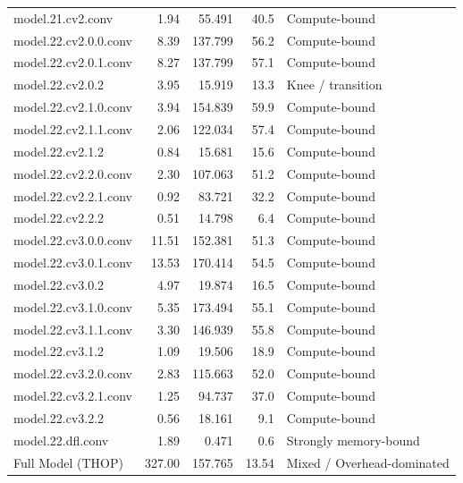 \documentclass[12pt,a4paper]{report}
\begin{document}
\begin{longtable}{p{} r r r p{}}
model.21.cv2.conv                    & 1.94  & 55.491  & 40.5 & Compute-bound \\
model.22.cv2.0.0.conv                & 8.39  & 137.799 & 56.2 & Compute-bound \\
model.22.cv2.0.1.conv                & 8.27  & 137.799 & 57.1 & Compute-bound \\
model.22.cv2.0.2                     & 3.95  & 15.919  & 13.3 & Knee / transition \\
model.22.cv2.1.0.conv                & 3.94  & 154.839 & 59.9 & Compute-bound \\
model.22.cv2.1.1.conv                & 2.06  & 122.034 & 57.4 & Compute-bound \\
model.22.cv2.1.2                     & 0.84  & 15.681  & 15.6 & Compute-bound \\
model.22.cv2.2.0.conv                & 2.30  & 107.063 & 51.2 & Compute-bound \\
model.22.cv2.2.1.conv                & 0.92  & 83.721  & 32.2 & Compute-bound \\
model.22.cv2.2.2                     & 0.51  & 14.798  & 6.4  & Compute-bound \\
model.22.cv3.0.0.conv                & 11.51 & 152.381 & 51.3 & Compute-bound \\
model.22.cv3.0.1.conv                & 13.53 & 170.414 & 54.5 & Compute-bound \\
model.22.cv3.0.2                     & 4.97  & 19.874  & 16.5 & Compute-bound \\
model.22.cv3.1.0.conv                & 5.35  & 173.494 & 55.1 & Compute-bound \\
model.22.cv3.1.1.conv                & 3.30  & 146.939 & 55.8 & Compute-bound \\
model.22.cv3.1.2                     & 1.09  & 19.506  & 18.9 & Compute-bound \\
model.22.cv3.2.0.conv                & 2.83  & 115.663 & 52.0 & Compute-bound \\
model.22.cv3.2.1.conv                & 1.25  & 94.737  & 37.0 & Compute-bound \\
model.22.cv3.2.2                     & 0.56  & 18.161  & 9.1  & Compute-bound \\
model.22.dfl.conv                    & 1.89  & 0.471   & 0.6  & Strongly memory-bound \\
\midrule
Full Model (THOP)                    & 327.00 & 157.765 & 13.54 & Mixed / Overhead-dominated \\

\end{longtable}
\end{document}
